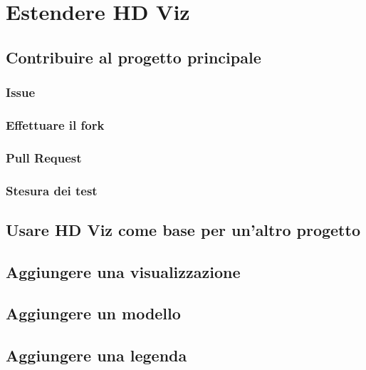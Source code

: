 \section{Estendere HD Viz}
    \subsection{Contribuire al progetto principale}
        \subsubsection{Issue}
        \subsubsection{Effettuare il fork}
        \subsubsection{Pull Request}
        \subsubsection{Stesura dei test}
    \subsection{Usare HD Viz come base per un'altro progetto}
    \subsection{Aggiungere una visualizzazione}
    \subsection{Aggiungere un modello}
    \subsection{Aggiungere una legenda}